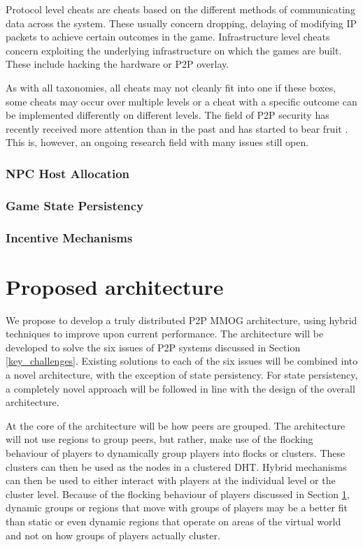 \documentclass[journal,oneside,a4paper,onecolumn]{IEEEtran}
\begin{document}
Protocol level cheats are cheats based on the different methods of communicating data across the system. These usually concern dropping, delaying of modifying IP packets to achieve certain outcomes in the game. Infrastructure level cheats concern exploiting the underlying infrastructure on which the games are built. These include hacking the hardware or P2P overlay.

As with all taxonomies, all cheats may not cleanly fit into one if these boxes, some cheats may occur over multiple levels or a cheat with a specific outcome can be implemented differently on different levels. The field of P2P security has recently received more attention than in the past and has started to bear fruit \cite{survey_p2p_game_cheats}. This is, however, an ongoing research field with many issues still open.

\subsubsection{NPC Host Allocation}
\subsubsection{Game State Persistency}
\subsubsection{Incentive Mechanisms}


\section{Proposed architecture}

We propose to develop a truly distributed P2P MMOG architecture, using hybrid techniques to improve upon current performance. The architecture will be developed to solve the six issues of P2P systems discussed in Section \ref{key_challenges}. Existing solutions to each of the six issues will be combined into a novel architecture, with the exception of state persistency. For state persistency, a completely novel approach will be followed in line with the design of the overall architecture.

At the core of the architecture will be how peers are grouped. The architecture will not use regions to group peers, but rather, make use of the flocking behaviour of players to dynamically group players into flocks or clusters. These clusters can then be used as the nodes in a clustered \ac{DHT}. Hybrid mechanisms can then be used to either interact with players at the individual level or the cluster level. Because of the flocking behaviour of players discussed in Section \ref{}, dynamic groups or regions that move with groups of players may be a better fit than static or even dynamic regions that operate on areas of the virtual world and not on how groups of players actually cluster.
\end{document}
